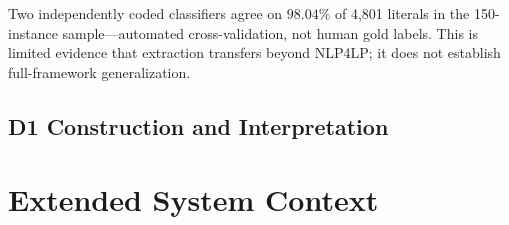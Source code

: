 \documentclass[pdflatex,sn-basic,Numbered]{sn-jnl}
\begin{document}
Two independently coded classifiers agree on $98.04\%$ of 4,801 literals in the 150-instance sample---automated cross-validation, not human gold labels. This is limited evidence that extraction transfers beyond \textsc{NLP4LP}; it does not establish full-framework generalization.


\subsection{D1 Construction and Interpretation}
\label{app:d1-details}


\FloatBarrier
\section{Extended System Context}
\label{app:related-context}

\setlength{\bibsep}{0.8em}

\end{document}
